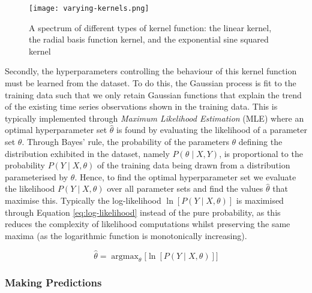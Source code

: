 \documentclass[a4paper, 11pt]{article}
\DeclareMathOperator*{\argmax}{argmax}
\begin{document}
    \begin{figure}[ht]
        \centering
        \caption{\centering A spectrum of different types of kernel function: the linear kernel, the radial basis function kernel, and the exponential sine squared kernel}
        \texttt{[image: varying-kernels.png]}
        \label{fig:kernels}
    \end{figure}

    Secondly, the hyperparameters controlling the behaviour of this kernel function must be learned from the dataset. To do this, the Gaussian process is fit to the training data such that we only retain Gaussian functions that explain the trend of the existing time series observations shown in the training data. This is typically implemented through \emph{Maximum Likelihood Estimation} (MLE) where an optimal hyperparameter set $\hat{\theta}$ is found by evaluating the likelihood of a parameter set $\theta$. Through Bayes' rule,  the probability of the parameters $\theta$ defining the distribution exhibited in the dataset, namely $P(\theta \mid X, Y)$, is proportional to the probability $P(Y \mid X, \theta)$ of the training data being drawn from a distribution parameterised by $\theta$. Hence, to find the optimal hyperparameter set we evaluate the likelihood $P(Y \mid X, \theta)$ over all parameter sets and find the values $\hat{\theta}$ that maximise this. Typically the log-likelihood $\ln\left[P(Y \mid X, \theta)\right]$ is maximised through Equation \ref{eq:log-likelihood} instead of the pure probability, as this reduces the complexity of likelihood computations whilst preserving the same maxima (as the logarithmic function is monotonically increasing).

    \begin{equation}
        \hat{\theta} = \argmax_{\theta} \big[\ln\left[P(Y \mid X, \theta)\right] \big]
        \label{eq:log-likelihood}
    \end{equation}

    \subsubsection{Making Predictions}
\end{document}
